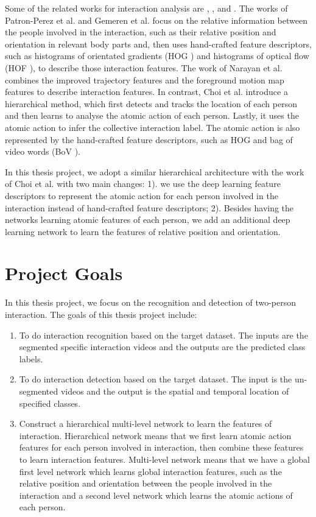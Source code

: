 Some of the related works for interaction analysis are \cite{patron2010}, \cite{Gemeren2015}, \cite{narayan2014} and \cite{choi2012}. The works of Patron-Perez et al. \cite{patron2010} and  Gemeren et al. \cite{Gemeren2015} focus on the relative information between the people involved in the interaction, such as their relative position and orientation in relevant body parts and, then uses hand-crafted feature descriptors, such as histograms of orientated gradients (HOG \cite{hog}) and histograms of optical flow (HOF \cite{hof}), to describe those interaction features. The work of Narayan et al. \cite{narayan2014} combines the improved trajectory features and the foreground motion map features to describe interaction features. In contrast, Choi et al. \cite{choi2012} introduce a hierarchical method, which first detects and tracks the location of each person and then learns to analyse the atomic action of each person. Lastly, it uses the atomic action to infer the collective interaction label. The atomic action is also represented by the hand-crafted feature descriptors, such as HOG and bag of video words (BoV \cite{bov}).
\par 
In this thesis project, we adopt a similar hierarchical architecture with the work of Choi et al. with two main changes: 1). we use the deep learning feature descriptors to represent the atomic action for each person involved in the interaction instead of hand-crafted feature descriptors; 2). Besides having the networks learning atomic features of each person, we add  an additional deep learning network to learn the features of relative position and orientation.   

\section{Project Goals}
\label{sec:intro_sec02}

In this thesis project, we focus on the recognition and detection of two-person interaction. The goals of this thesis project include: 
\begin{enumerate}
	\item To do interaction recognition based on the target dataset. The inputs are the segmented specific interaction videos and the outputs are the predicted class labels.
	\item To do interaction detection based on the target dataset. The input is the un-segmented videos and the output is the spatial and temporal location of specified classes. 
	\item Construct a hierarchical multi-level network to learn the features of interaction. Hierarchical network means that we first learn atomic action features for each person involved in interaction, then combine these features to learn interaction features. Multi-level network means that we have a global first level network which learns global interaction features, such as the relative position and orientation between the people involved in the interaction and a second level network which learns the atomic actions of each person.
\end{enumerate}

